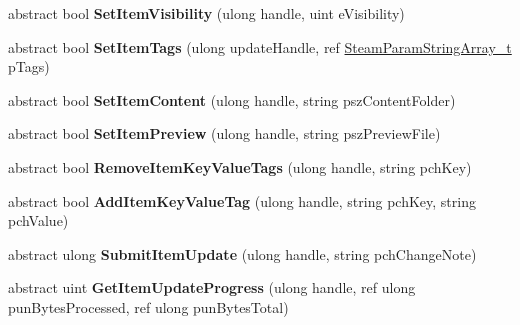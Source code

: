 \begin{DoxyCompactItemize}
\item 
\hypertarget{classValve_1_1Steamworks_1_1ISteamUGC_ac7d8de3bd2ba0b2a76de7f7aba42bae7}{}abstract bool {\bfseries Set\+Item\+Visibility} (ulong handle, uint e\+Visibility)\label{classValve_1_1Steamworks_1_1ISteamUGC_ac7d8de3bd2ba0b2a76de7f7aba42bae7}

\item 
\hypertarget{classValve_1_1Steamworks_1_1ISteamUGC_a6447178e7f023078842ed48d18755d9b}{}abstract bool {\bfseries Set\+Item\+Tags} (ulong update\+Handle, ref \hyperlink{structValve_1_1Steamworks_1_1SteamParamStringArray__t}{Steam\+Param\+String\+Array\+\_\+t} p\+Tags)\label{classValve_1_1Steamworks_1_1ISteamUGC_a6447178e7f023078842ed48d18755d9b}

\item 
\hypertarget{classValve_1_1Steamworks_1_1ISteamUGC_ab81805a14474b53a9e6aa6e36267ae83}{}abstract bool {\bfseries Set\+Item\+Content} (ulong handle, string psz\+Content\+Folder)\label{classValve_1_1Steamworks_1_1ISteamUGC_ab81805a14474b53a9e6aa6e36267ae83}

\item 
\hypertarget{classValve_1_1Steamworks_1_1ISteamUGC_a1bdd6830092ec68053f454adcb251f39}{}abstract bool {\bfseries Set\+Item\+Preview} (ulong handle, string psz\+Preview\+File)\label{classValve_1_1Steamworks_1_1ISteamUGC_a1bdd6830092ec68053f454adcb251f39}

\item 
\hypertarget{classValve_1_1Steamworks_1_1ISteamUGC_a6892ade790740f9279e6dc58d252b4fb}{}abstract bool {\bfseries Remove\+Item\+Key\+Value\+Tags} (ulong handle, string pch\+Key)\label{classValve_1_1Steamworks_1_1ISteamUGC_a6892ade790740f9279e6dc58d252b4fb}

\item 
\hypertarget{classValve_1_1Steamworks_1_1ISteamUGC_a703fd86004e60f37b12e5dd92c0918c1}{}abstract bool {\bfseries Add\+Item\+Key\+Value\+Tag} (ulong handle, string pch\+Key, string pch\+Value)\label{classValve_1_1Steamworks_1_1ISteamUGC_a703fd86004e60f37b12e5dd92c0918c1}

\item 
\hypertarget{classValve_1_1Steamworks_1_1ISteamUGC_ad151ceae82360c056b45471ed36c9380}{}abstract ulong {\bfseries Submit\+Item\+Update} (ulong handle, string pch\+Change\+Note)\label{classValve_1_1Steamworks_1_1ISteamUGC_ad151ceae82360c056b45471ed36c9380}

\item 
\hypertarget{classValve_1_1Steamworks_1_1ISteamUGC_aec8bb0670fbd731cf91098de73970b83}{}abstract uint {\bfseries Get\+Item\+Update\+Progress} (ulong handle, ref ulong pun\+Bytes\+Processed, ref ulong pun\+Bytes\+Total)\label{classValve_1_1Steamworks_1_1ISteamUGC_aec8bb0670fbd731cf91098de73970b83}


\end{DoxyCompactItemize}
